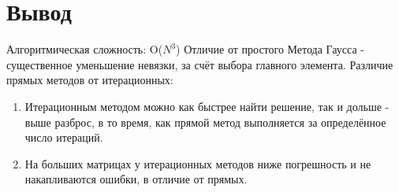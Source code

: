 \section{Вывод}
Алгоритмическая сложность: O($N^3$)
Отличие от простого Метода Гаусса - существенное уменьшение невязки, за счёт выбора главного элемента.
Различие прямых методов от итерационных:
\begin{enumerate}
    \item Итерационным методом можно как быстрее найти решение, так и дольше - выше разброс, в то время, как прямой метод выполняется за определённое число итераций.
    \item На больших матрицах у итерационных методов ниже погрешность и не накапливаются ошибки, в отличие от прямых.
\end{enumerate}
